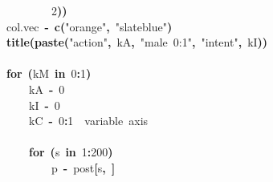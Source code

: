 \documentclass{article}
\makeatletter
\newcommand{\hlnumber}[1]{\textcolor[rgb]{0,0,0}{#1}}%
\newcommand{\hlfunctioncall}[1]{\textcolor[rgb]{.5,0,.33}{\textbf{#1}}}%
\newcommand{\hlstring}[1]{\textcolor[rgb]{.6,.6,1}{#1}}%
\newcommand{\hlkeyword}[1]{\textbf{#1}}%
\newcommand{\hlcomment}[1]{\textcolor[rgb]{.18,.6,.34}{#1}}%
\newcommand{\hlassignement}[1]{\textbf{#1}}%
\newcommand{\hlsymbol}[1]{#1}%
\newcommand{\hlstd}[1]{\textcolor[rgb]{0,0,0}{#1}}%
\newenvironment{kframe}{%
 \def\FrameCommand##1{\hskip\@totalleftmargin \hskip-\fboxsep
 \colorbox{shadecolor}{##1}\hskip-\fboxsep
     \hskip-\linewidth \hskip-\@totalleftmargin \hskip\columnwidth}%
 \MakeFramed {\advance\hsize-\width
   \@totalleftmargin\z@ \linewidth\hsize
   \@setminipage}}%
 {\par\unskip\endMakeFramed}
\newenvironment{knitrout}{}{} %
\makeatother
\begin{document}
\begin{knitrout}
{\begin{kframe}
\begin{flushleft}
\hlstd{}{\ }{\ }{\ }{\ }{\ }{\ }{\ }{\ }\hlnumber{2}\hlkeyword{)}\hlkeyword{)}\hspace*{\fill}\\
\hlstd{}\hlsymbol{col.vec}{\ }\hlassignement{\usebox{\hlnormalsizeboxlessthan}-}{\ }\hlfunctioncall{c}\hlkeyword{(}\hlstring{"{}orange"{}}\hlkeyword{,}{\ }\hlstring{"{}slateblue"{}}\hlkeyword{)}\hspace*{\fill}\\
\hlstd{}\hlfunctioncall{title}\hlkeyword{(}\hlfunctioncall{paste}\hlkeyword{(}\hlstring{"{}action"{}}\hlkeyword{,}{\ }\hlsymbol{kA}\hlkeyword{,}{\ }\hlstring{"{}male{\ }0:1"{}}\hlkeyword{,}{\ }\hlstring{"{}intent"{}}\hlkeyword{,}{\ }\hlsymbol{kI}\hlkeyword{)}\hlkeyword{)}\hspace*{\fill}\\
\hlstd{}\hspace*{\fill}\\
\hlstd{}\hlkeyword{for}{\ }\hlkeyword{(}\hlsymbol{kM}{\ }\hlkeyword{in}{\ }\hlnumber{0}\hlkeyword{:}\hlnumber{1}\hlkeyword{)}{\ }\hlkeyword{\usebox{\hlnormalsizeboxopenbrace}}\hspace*{\fill}\\
\hlstd{}{\ }{\ }{\ }{\ }\hlsymbol{kA}{\ }\hlassignement{\usebox{\hlnormalsizeboxlessthan}-}{\ }\hlnumber{0}\hspace*{\fill}\\
\hlstd{}{\ }{\ }{\ }{\ }\hlsymbol{kI}{\ }\hlassignement{\usebox{\hlnormalsizeboxlessthan}-}{\ }\hlnumber{0}\hspace*{\fill}\\
\hlstd{}{\ }{\ }{\ }{\ }\hlsymbol{kC}{\ }\hlassignement{\usebox{\hlnormalsizeboxlessthan}-}{\ }\hlnumber{0}\hlkeyword{:}\hlnumber{1}{\ }{\ }\hlcomment{\usebox{\hlnormalsizeboxhash}\usebox{\hlnormalsizeboxhash}{\ }variable{\ }axis}\hspace*{\fill}\\
\hlstd{}\hspace*{\fill}\\
\hlstd{}{\ }{\ }{\ }{\ }\hlkeyword{for}{\ }\hlkeyword{(}\hlsymbol{s}{\ }\hlkeyword{in}{\ }\hlnumber{1}\hlkeyword{:}\hlnumber{200}\hlkeyword{)}{\ }\hlkeyword{\usebox{\hlnormalsizeboxopenbrace}}\hspace*{\fill}\\
\hlstd{}{\ }{\ }{\ }{\ }{\ }{\ }{\ }{\ }\hlsymbol{p}{\ }\hlassignement{\usebox{\hlnormalsizeboxlessthan}-}{\ }\hlsymbol{post}\hlkeyword{[}\hlsymbol{s}\hlkeyword{,}{\ }\hlkeyword{]}\hspace*{\fill}\\

\end{flushleft}
\end{kframe}}
\end{knitrout}
\end{document}
